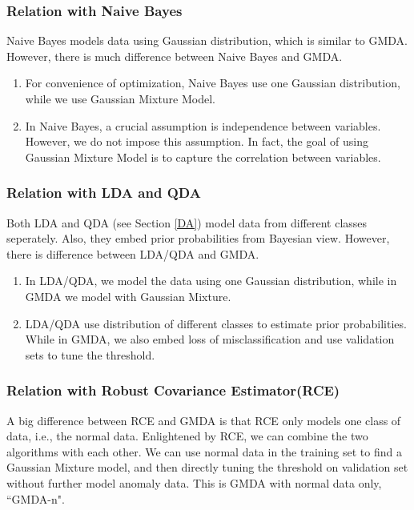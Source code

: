 \documentclass[english]{article}
\begin{document}
\subsubsection{Relation with Naive Bayes}
\par

Naive Bayes models data using Gaussian distribution, which is similar to GMDA. However, there is much difference between Naive Bayes and GMDA.
\begin{enumerate}
\item For convenience of optimization, Naive Bayes use one Gaussian distribution, while we use Gaussian Mixture Model.
\item In Naive Bayes, a crucial assumption is independence between variables. However, we do not impose this assumption. In fact, the goal of using Gaussian Mixture Model is to capture the correlation between variables.
\end{enumerate}

\subsubsection{Relation with LDA and QDA}
\par

Both LDA and QDA (see Section \ref{DA}) model data from different classes seperately. Also, they embed prior probabilities from Bayesian view. However, there is difference between LDA/QDA and GMDA.
\begin{enumerate}
\item In LDA/QDA, we model the data using one Gaussian distribution, while in GMDA we model with Gaussian Mixture.
\item LDA/QDA use distribution of different classes to estimate prior probabilities. While in GMDA, we also embed loss of misclassification and use validation sets to tune the threshold. 
\end{enumerate}

\subsubsection{Relation with Robust Covariance Estimator(RCE)}
\par

A big difference between RCE and GMDA is that RCE only models one class of data, i.e., the normal data. Enlightened by RCE, we can combine the two algorithms with each other. We can use normal data in the training set to find a Gaussian Mixture model, and then directly tuning the threshold on validation set without further model anomaly data. This is GMDA with normal data only, ``GMDA-n".
\end{document}
